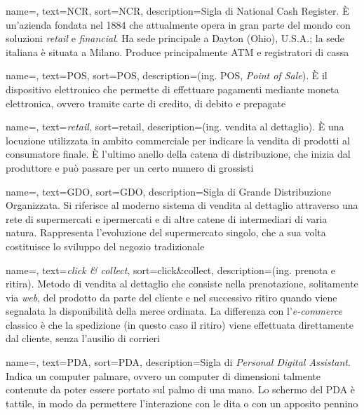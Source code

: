  {
	name=,
	text=NCR,
	sort=NCR,
	description={Sigla di National Cash Register. È un'azienda fondata nel 1884 che attualmente opera in gran parte del mondo con soluzioni \textit{retail} e \textit{financial}. Ha sede principale a Dayton (Ohio), U.S.A.; la sede italiana è situata a Milano. Produce principalmente ATM e registratori di cassa}
}

 {
	name=,
	text=POS,
	sort=POS,
	description={(ing. POS, \textit{Point of Sale}). È il dispositivo elettronico che permette di effettuare pagamenti mediante moneta elettronica, ovvero tramite carte di credito, di debito e prepagate}
}

 {
	name=,
	text=\textit{retail},
	sort=retail,
	description={(ing. vendita al dettaglio). È una locuzione utilizzata in ambito commerciale per indicare la vendita di prodotti al consumatore finale. È l'ultimo anello della catena di distribuzione, che inizia dal produttore e può passare per un certo numero di grossisti}
}

 {
	name=,
	text=GDO,
	sort=GDO,
	description={Sigla di Grande Distribuzione Organizzata. Si riferisce al moderno sistema di vendita al dettaglio attraverso una rete di supermercati e ipermercati e di altre catene di intermediari di varia natura. Rappresenta l'evoluzione del supermercato singolo, che a sua volta costituisce lo sviluppo del negozio tradizionale}
}

 {
	name=,
	text=\textit{click \& collect},
	sort=click\&collect,
	description={(ing. prenota e ritira). Metodo di vendita al dettaglio che consiste nella prenotazione, solitamente via \textit{web}, del prodotto da parte del cliente e nel successivo ritiro quando viene segnalata la disponibilità della merce ordinata. La differenza con l'\textit{e-commerce} classico è che la spedizione (in questo caso il ritiro) viene effettuata direttamente dal cliente, senza l'ausilio di corrieri}
}

 {
	name=,
	text=PDA,
	sort=PDA,
	description={Sigla di \textit{Personal Digital Assistant}. Indica un computer palmare, ovvero un computer di dimensioni talmente contenute da poter essere portato sul palmo di una mano. Lo schermo del PDA è tattile, in modo da permettere l'interazione con le dita o con un apposito pennino}
}

